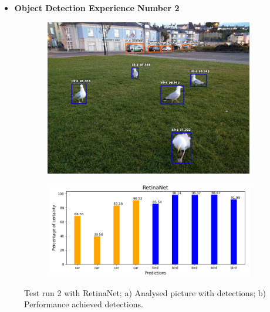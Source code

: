       \newpage

      
  \begin{itemize}
    \item \textbf{Object Detection Experience Number 2}
  \end{itemize}

    

      \begin{figure}[H]
        \centering
        \captionsetup{justification=centering}

        \begin{subfigure}{0.29\textwidth}
        \includegraphics[width=\textwidth]{Sections/4InitialWork/4_images_obj_run3/retinaNet.jpg} 
        \caption{}
        \end{subfigure}
        \begin{subfigure}{0.65\textwidth}
        \includegraphics[width=\textwidth]{Sections/4InitialWork/4_images_obj_run3/retinaNet_graph.png}
        \caption{}
        \end{subfigure}
        
        \caption[Test run 2 with RetinaNet]{ 
        Test run 2 with RetinaNet; a) Analysed picture with detections; b) Performance achieved detections. }
        \label{fig:retina_2}
        \end{figure}



